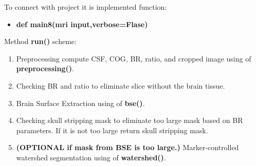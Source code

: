 To connect with project it is implemented function:
\begin{itemize}
    \item {\textbf{def main8(mri input,verbose=Flase)}}
\end{itemize}
Method \textbf{run()} scheme:
\begin{enumerate}
    \item {Preprocessing compute CSF, COG, BR, ratio, and cropped image using of \textbf{preprocessing()}.}
    \item {Checking BR and ratio to eliminate slice without the brain tissue.}
    \item {Brain Surface Extraction using of \textbf{bse()}.}
    \item {Checking skull stripping mask to eliminate too large mask based on BR parameters. If it is not too large return skull stripping mask.}
    \item {\textbf{(OPTIONAL if mask from BSE is too large.)} Marker-controlled watershed segmentation using of \textbf{watershed()}.}
\end{enumerate}


